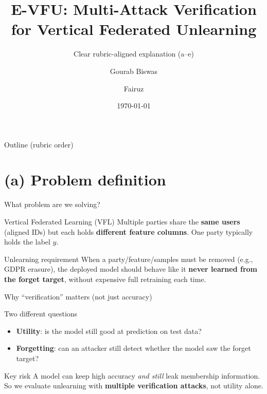 \documentclass[aspectratio=169, 11pt]{beamer}
\title[E-VFU]{E-VFU: Multi-Attack Verification for Vertical Federated Unlearning}
\subtitle{Clear rubric-aligned explanation (a–e)}
\author{Gourab Biswas \and Fairuz}
\institute{Undergraduate ML project}
\date{\today}
\begin{document}
\begin{frame}
  \titlepage
\end{frame}

\begin{frame}{Outline (rubric order)}
  \tableofcontents
\end{frame}

\section{(a) Problem definition}

\begin{frame}{What problem are we solving?}
  \begin{block}{Vertical Federated Learning (VFL)}
    Multiple parties share the \textbf{same users} (aligned IDs) but each holds \textbf{different feature columns}.
    One party typically holds the label $y$.
  \end{block}
  \vspace{0.6em}
  \begin{alertblock}{Unlearning requirement}
    When a party/feature/samples must be removed (e.g., GDPR erasure), the deployed model should behave like it
    \textbf{never learned from the forget target}, without expensive full retraining each time.
  \end{alertblock}
\end{frame}

\begin{frame}{Why ``verification'' matters (not just accuracy)}
  \begin{block}{Two different questions}
    \begin{itemize}
      \item \textbf{Utility}: is the model still good at prediction on test data?
      \item \textbf{Forgetting}: can an attacker still detect whether the model saw the forget target?
    \end{itemize}
  \end{block}
  \vspace{0.6em}
  \begin{alertblock}{Key risk}
    A model can keep high accuracy \emph{and still} leak membership information.
    So we evaluate unlearning with \textbf{multiple verification attacks}, not utility alone.
  \end{alertblock}
\end{frame}
\end{document}
